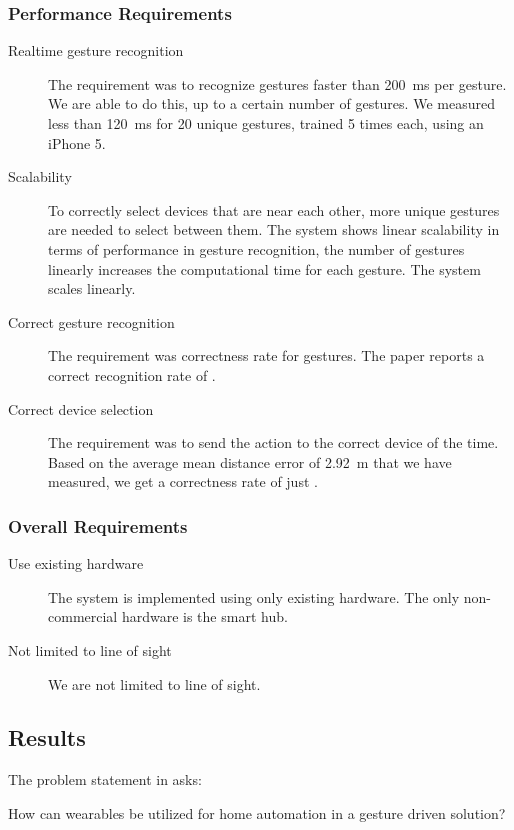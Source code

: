\subsubsection{Performance Requirements}
\begin{description}
  \item[\yes Realtime gesture recognition] The requirement was to recognize gestures faster than \SI{200}{\milli\second} per gesture. We are able to do this, up to a certain number of gestures. We measured less than \SI{120}{\milli\second} for \num{20} unique gestures, trained \num{5} times each, using an iPhone 5.
  \item[\yes Scalability] To correctly select devices that are near each other, more unique gestures are needed to select between them. The system shows linear scalability in terms of performance in gesture recognition, \ie the number of gestures linearly increases the computational time for each gesture. The system scales linearly.  
  \item[\yes Correct gesture recognition] The requirement was  correctness rate for gestures. The \threedollar paper \cite{threedollar} reports a correct recognition rate of .
  \item[\no Correct device selection] The requirement was to send the action to the correct device  of the time. Based on the average mean distance error of \SI{2.92}{\meter} that we have measured, we get a correctness rate of just . 
\end{description}

\subsubsection{Overall Requirements}
\begin{description}
  \item[\yes Use existing hardware] The system is implemented using only existing hardware. The only non-commercial hardware is the smart hub. 
  \item[\yes Not limited to line of sight] We are not limited to line of sight. 
\end{description}

\subsection{Results}
The problem statement in  asks:
\begin{framed}
  How can wearables be utilized for home automation in a gesture driven solution?
\end{framed}

